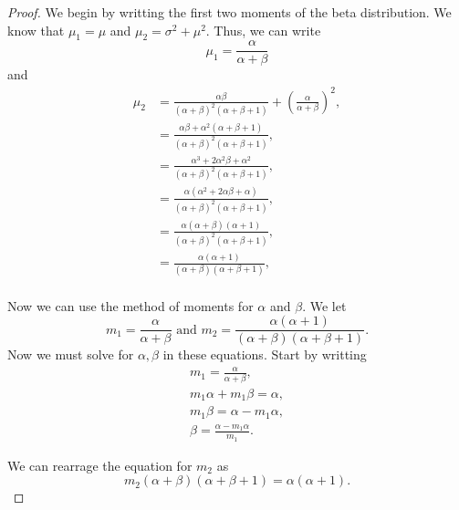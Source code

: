 \documentclass{article}
\begin{document}
\begin{proof}
    We begin by writting the first two moments of the beta distribution.
    We know that $\mu_1 = \mu$ and $\mu_2 = \sigma^2 + \mu^2$. Thus, we can write
    \begin{equation*}
        \mu_1 = \frac{\alpha}{\alpha + \beta}
    \end{equation*}
    and
    \begin{align*}
        \mu_2 & = \frac{\alpha \beta}{(\alpha + \beta)^2(\alpha + \beta + 1)}
        + \left(\frac{\alpha}{\alpha + \beta}\right)^2,                                                      \\
              & = \frac{\alpha\beta + \alpha^2(\alpha + \beta + 1)}{(\alpha + \beta)^2(\alpha + \beta + 1)}, \\
              & = \frac{\alpha^3 + 2\alpha^2\beta + \alpha^2}{(\alpha + \beta)^2(\alpha + \beta + 1)},       \\
              & = \frac{\alpha(\alpha^2 + 2\alpha\beta + \alpha)}{(\alpha + \beta)^2(\alpha + \beta + 1)},   \\
              & = \frac{\alpha(\alpha + \beta)(\alpha + 1)}{(\alpha + \beta)^2(\alpha + \beta + 1)},         \\
              & = \frac{\alpha(\alpha + 1)}{(\alpha + \beta)(\alpha + \beta + 1)},                           \\
    \end{align*}

    Now we can use the method of moments for $\alpha$ and $\beta$. We let
    \begin{equation*}
        m_1 = \frac{\alpha}{\alpha + \beta}
        \text{ and }
        m_2 = \frac{\alpha(\alpha + 1)}{(\alpha + \beta)(\alpha + \beta + 1)}.
    \end{equation*}
    Now we must solve for $\alpha, \beta$ in these equations. Start by writting
    \begin{gather*}
        m_1 = \frac{\alpha}{\alpha + \beta}, \\
        m_1\alpha + m_1\beta = \alpha, \\
        m_1\beta = \alpha - m_1\alpha,\\
        \beta = \frac{\alpha - m_1\alpha}{m_1}.
    \end{gather*}

    We can rearrage the equation for $m_2$ as
    \begin{equation*}
        m_2(\alpha + \beta)(\alpha +\beta + 1) = \alpha(\alpha + 1).
    \end{equation*}


\end{proof}
\end{document}
